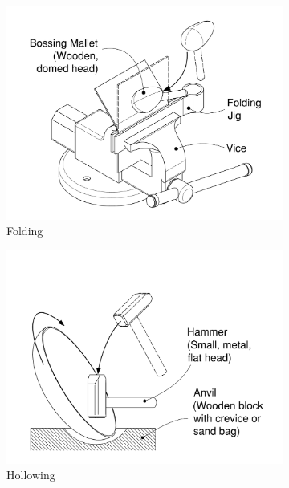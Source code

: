 \begin{figure}[]
\centering
\begin{subfigure}{.4\textwidth}
  \centering
  \includegraphics[width=0.9\linewidth]{Images/FoldingTechDrawing.pdf}  
  \caption{Folding}
  \label{fig:Folding}
\end{subfigure}
%
\begin{subfigure}{.4\textwidth}
  \centering
  \includegraphics[width=0.9\linewidth]{Images/HollowingTechDrawing.pdf}  
  \caption{Hollowing}
  \label{fig:Hollowing}
\end{subfigure}
%
\begin{subfigure}{.4\textwidth}
  \centering

\end{subfigure}
\end{figure}
